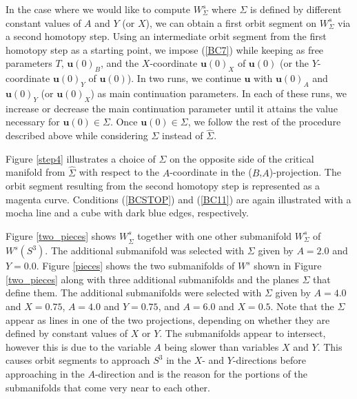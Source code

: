 \documentclass{ws-ijbc}
\begin{document}
In the case where we would like to compute $W^{s}_{\Sigma}$ where $\Sigma$ is defined by different constant values of $A$ and $Y$ (or $X$), we can obtain a first orbit segment on $W^{s}_{\Sigma}$ via a second homotopy step.  Using an intermediate orbit segment from the first homotopy step as a starting point, we impose (\ref{BC7}) while keeping as free parameters $T$, $\mathbf{u}(0)_B$, and the $X$-coordinate $\mathbf{u}(0)_X$ of $\mathbf{u}(0)$ (or the $Y$-coordinate  $\mathbf{u}(0)_Y$ of $\mathbf{u}(0)$).  In two runs, we continue $\mathbf{u}$ with $\mathbf{u}(0)_A$ and $\mathbf{u}(0)_Y$ (or $\mathbf{u}(0)_X$) as main continuation parameters.  In each of these runs, we increase or decrease the main continuation parameter until it attains the value necessary for $\mathbf{u}(0) \in \Sigma$.  Once $\mathbf{u}(0) \in \Sigma$, we follow the rest of the procedure described above while considering $\Sigma$ instead of $\widehat{\Sigma}$.

Figure \ref{step4} illustrates a choice of $\Sigma$ on the opposite side of the critical manifold from $\widehat{\Sigma}$ with respect to the $A$-coordinate in the ($B$,$A$)-projection.  The orbit segment resulting from the second homotopy step is represented as a magenta curve.  Conditions (\ref{BCSTOP}) and (\ref{BC11}) are again illustrated with a mocha line and a cube with dark blue edges, respectively.

Figure \ref{two_pieces} shows $W^s_{\widehat{\Sigma}}$ together with one other submanifold $W^{s}_{\Sigma}$ of $W^{s}(S^3)$.  The additional submanifold was selected with $\Sigma$ given by $A=2.0$ and $Y=0.0$.  Figure \ref{pieces} shows the two submanifolds of $W^{s}$ shown in Figure \ref{two_pieces} along with three additional submanifolds and the planes $\Sigma$ that define them.  The additional submanifolds were selected with $\Sigma$ given by $A=4.0$ and $X=0.75$, $A=4.0$ and $Y=0.75$, and $A=6.0$ and $X=0.5$.  Note that the $\Sigma$ appear as lines in one of the two projections, depending on whether they are defined by constant values of $X$ or $Y$.  The submanifolds appear to intersect, however this is due to the variable $A$ being slower than variables $X$ and $Y$.  This causes orbit segments to approach $S^3$ in the $X$- and $Y$-directions before approaching in the $A$-direction and is the reason for the portions of the submanifolds that come very near to each other.
\end{document}
